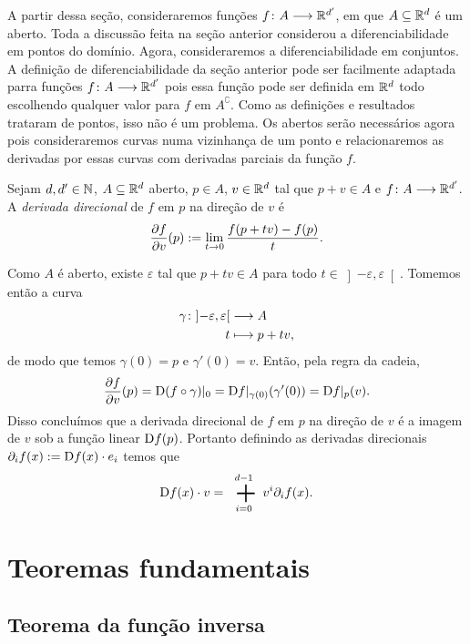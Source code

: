 A partir dessa seção, consideraremos funções ${f}\colon {A} \longrightarrow {\mathbb{R}^{d'}}$, em que $A \subseteq \mathbb{R}^d$ é um aberto. Toda a discussão feita na seção anterior considerou a diferenciabilidade em pontos do domínio. Agora, consideraremos a diferenciabilidade em conjuntos. A definição de diferenciabilidade da seção anterior pode ser facilmente adaptada parra funções ${f}\colon {A} \longrightarrow {\mathbb{R}^{d'}}$ pois essa função pode ser definida em $\mathbb{R}^d$ todo escolhendo qualquer valor para $f$ em $A^\complement$. Como as definições e resultados trataram de pontos, isso não é um problema. Os abertos serão necessários agora pois consideraremos curvas numa vizinhança de um ponto e relacionaremos as derivadas por essas curvas com derivadas parciais da função $f$.

\begin{definition}
Sejam $d,d' \in \mathbb{N}$, $A \subseteq \mathbb{R}^d$ aberto, $p \in A$, $v \in \mathbb{R}^d$ tal que $p+v \in A$ e ${f}\colon {A} \longrightarrow {\mathbb{R}^{d'}}$. A \emph{derivada direcional} de $f$ em $p$ na direção de $v$ é
	\begin{equation*}
	\frac{\partial{f}}{\partial{v}}(p) := \lim_{t \rightarrow 0} \frac{f(p+tv)-f(p)}{t}.
	\end{equation*}
\end{definition}

Como $A$ é aberto, existe $\varepsilon$ tal que $p+tv \in A$ para todo $t \in \left]-\varepsilon,\varepsilon \right[$. Tomemos então a curva
	\begin{align*}
	{\gamma}\colon {\left]-\varepsilon,\varepsilon \right[} &\longrightarrow {A} \\{t} &\longmapsto p+tv,
	\end{align*}
de modo que temos $\gamma(0)=p$ e $\gamma'(0) = v$. Então, pela regra da cadeia,
	\begin{equation*}
	 \frac{\partial{f}}{\partial{v}}(p) = \mathrm{D} (f \circ \gamma)|_0 = \mathrm{D} f|_{\gamma(0)} (\gamma'(0)) = \mathrm{D} f|_p(v).
	\end{equation*}
Disso concluímos que a derivada direcional de $f$ em $p$ na direção de $v$ é a imagem de $v$ sob a função linear $\mathrm{D} f(p)$. Portanto definindo as derivadas direcionais $\partial_i f(x) := \mathrm{D} f(x) \cdot e_i$ temos que
	\begin{equation*}
	\D f(x) \cdot v = \sum_{i=0}^{d-1} v^i \partial_i f(x).
	\end{equation*}

\section{Teoremas fundamentais}

\subsection{Teorema da função inversa}

